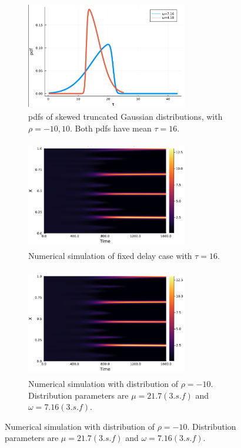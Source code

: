 \begin{figure}[H]
    \centering
    \begin{subfigure}[t]{0.45\textwidth}
        \centering
        \includegraphics[width=7cm,height=4.75cm]{dist16.png}
        \caption{pdfs of skewed truncated Gaussian distributions, with $\rho=-10,10$. Both pdfs have mean $\tau=16$.}
        \label{}
    \end{subfigure}
    \hfill
    \begin{subfigure}[t]{0.45\textwidth}
        \centering
        \includegraphics[width=7cm,height=4.75cm]{fixt16.png}
        \caption{Numerical simulation of fixed delay case with $\tau=16$.}
        \label{}
    \end{subfigure}
    \hfill
    \begin{subfigure}[t]{0.45\textwidth}
        \centering
        \includegraphics[width=7cm,height=4.75cm]{t16m10.png}
        \caption{Numerical simulation with distribution of $\rho=-10$. Distribution parameters are $\mu=21.7(3.s.f)$ and $\omega=7.16(3.s.f)$.}
        \label{}
    \end{subfigure}

\end{figure}

